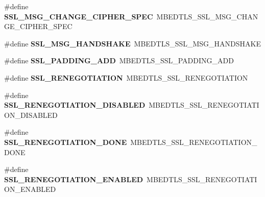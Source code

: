 \begin{DoxyCompactItemize}
\item 
\mbox{\label{compat-1_83_8h_a738eccdfea2b6a0de26231a0c2aafe4f}} 
\#define {\bfseries S\+S\+L\+\_\+\+M\+S\+G\+\_\+\+C\+H\+A\+N\+G\+E\+\_\+\+C\+I\+P\+H\+E\+R\+\_\+\+S\+P\+EC}~M\+B\+E\+D\+T\+L\+S\+\_\+\+S\+S\+L\+\_\+\+M\+S\+G\+\_\+\+C\+H\+A\+N\+G\+E\+\_\+\+C\+I\+P\+H\+E\+R\+\_\+\+S\+P\+EC
\item 
\mbox{\label{compat-1_83_8h_add1f218869a9aeb6f8b1190a99f0625a}} 
\#define {\bfseries S\+S\+L\+\_\+\+M\+S\+G\+\_\+\+H\+A\+N\+D\+S\+H\+A\+KE}~M\+B\+E\+D\+T\+L\+S\+\_\+\+S\+S\+L\+\_\+\+M\+S\+G\+\_\+\+H\+A\+N\+D\+S\+H\+A\+KE
\item 
\mbox{\label{compat-1_83_8h_a5838cb2225af69ac4e71284c3186b1c6}} 
\#define {\bfseries S\+S\+L\+\_\+\+P\+A\+D\+D\+I\+N\+G\+\_\+\+A\+DD}~M\+B\+E\+D\+T\+L\+S\+\_\+\+S\+S\+L\+\_\+\+P\+A\+D\+D\+I\+N\+G\+\_\+\+A\+DD
\item 
\mbox{\label{compat-1_83_8h_aa061ebaead3d10597d95050554179908}} 
\#define {\bfseries S\+S\+L\+\_\+\+R\+E\+N\+E\+G\+O\+T\+I\+A\+T\+I\+ON}~M\+B\+E\+D\+T\+L\+S\+\_\+\+S\+S\+L\+\_\+\+R\+E\+N\+E\+G\+O\+T\+I\+A\+T\+I\+ON
\item 
\mbox{\label{compat-1_83_8h_aa5c9fd70cb3431d8ab7280ec69a93a57}} 
\#define {\bfseries S\+S\+L\+\_\+\+R\+E\+N\+E\+G\+O\+T\+I\+A\+T\+I\+O\+N\+\_\+\+D\+I\+S\+A\+B\+L\+ED}~M\+B\+E\+D\+T\+L\+S\+\_\+\+S\+S\+L\+\_\+\+R\+E\+N\+E\+G\+O\+T\+I\+A\+T\+I\+O\+N\+\_\+\+D\+I\+S\+A\+B\+L\+ED
\item 
\mbox{\label{compat-1_83_8h_a0293648bc85846f7bf32075bfb6a7427}} 
\#define {\bfseries S\+S\+L\+\_\+\+R\+E\+N\+E\+G\+O\+T\+I\+A\+T\+I\+O\+N\+\_\+\+D\+O\+NE}~M\+B\+E\+D\+T\+L\+S\+\_\+\+S\+S\+L\+\_\+\+R\+E\+N\+E\+G\+O\+T\+I\+A\+T\+I\+O\+N\+\_\+\+D\+O\+NE
\item 
\mbox{\label{compat-1_83_8h_a3f3f42e9bf819a4fc589351c103d221b}} 
\#define {\bfseries S\+S\+L\+\_\+\+R\+E\+N\+E\+G\+O\+T\+I\+A\+T\+I\+O\+N\+\_\+\+E\+N\+A\+B\+L\+ED}~M\+B\+E\+D\+T\+L\+S\+\_\+\+S\+S\+L\+\_\+\+R\+E\+N\+E\+G\+O\+T\+I\+A\+T\+I\+O\+N\+\_\+\+E\+N\+A\+B\+L\+ED
\item 
\mbox{\label{compat-1_83_8h_af7a8a713832ae0164b5298c75945ba0e}} 

\end{DoxyCompactItemize}
